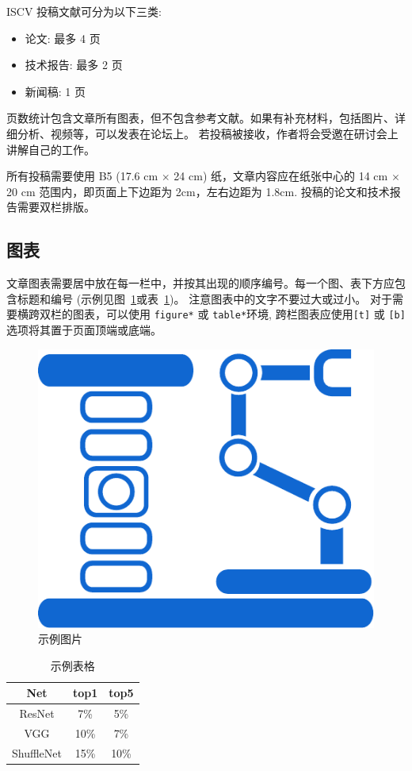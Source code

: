\documentclass[10pt]{article}
\begin{document}
ISCV 投稿文献可分为以下三类:
\begin{itemize}
    \item 论文: 最多 4 页
    \item 技术报告: 最多 2 页
    \item 新闻稿: 1 页
\end{itemize}
页数统计包含文章所有图表，但不包含参考文献。如果有补充材料，包括图片、详细分析、视频等，可以发表在论坛上。
若投稿被接收，作者将会受邀在研讨会上讲解自己的工作。

所有投稿需要使用 B5  (17.6 cm $\times$ 24 cm) 纸，文章内容应在纸张中心的 {14 cm $\times$ 20 cm} 范围内，即页面上下边距为 2cm，左右边距为 1.8cm.
投稿的论文和技术报告需要双栏排版。

\subsection{图表}
文章图表需要居中放在每一栏中，并按其出现的顺序编号。每一个图、表下方应包含标题和编号 (示例见图~\ref{fig:example}或表~\ref{tab:example})。
注意图表中的文字不要过大或过小。
对于需要横跨双栏的图表，可以使用 \texttt{figure*} 或 \texttt{table*}环境, 跨栏图表应使用\texttt{[t]} 或 \texttt{[b]} 选项将其置于页面顶端或底端。

\begin{figure}[h]
\centering
\includegraphics[width=.5\linewidth]{figs/fig1.pdf}
\caption{示例图片} 
\label{fig:example}
\end{figure}

\begin{table}[h]
\centering\begin{tabular}{ccc}
\toprule
Net & top1 & top5 \\
\midrule
ResNet & 7\% & 5\% \\
VGG & 10\% & 7\% \\
ShuffleNet & 15\% & 10\% \\
\bottomrule
\end{tabular}
\caption{示例表格}
\label{tab:example}
\end{table}
\end{document}
